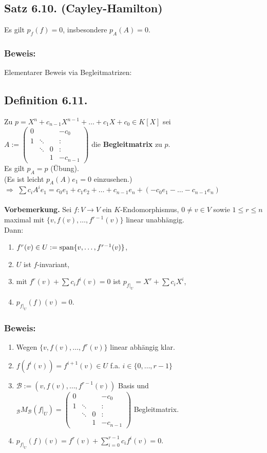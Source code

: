 \documentclass[a4paper, 12pt]{extarticle}
\newcommand{\tn}[1]{\textnormal {#1}}
\begin{document}
\subsection*{Satz 6.10. (Cayley-Hamilton)}
Es gilt $p_f(f)=0$, insbesondere $p_A(A)=0$.
\subsubsection*{Beweis:}
Elementarer Beweis via Begleitmatrizen:
\subsection*{Definition 6.11.}
Zu $p = X^n+c_{n-1}X^{n-1}+\dots+c_1X+c_0\in K[X]$ sei\\
$A :=
\left(\begin{matrix}
	0 & & & -c_0\\
	1 & \ddots & & \colon\\
	 & \ddots & 0 & \colon\\
	 & & 1 & -c_{n-1}
\end{matrix}\right)$ die \textbf{Begleitmatrix} zu $p$.\\
Es gilt $p_A = p$ (Übung).\\
(Es ist leicht $p_A(A)e_1 = 0$ einzusehen.)\\
$\Rightarrow$ $\sum c_iA^ie_1 = c_0e_1+c_1e_2+\dots+c_{n-1}e_n+(-c_0e_1-\dots-c_{n-1}e_n)$\\\\
\textbf{Vorbemerkung.} Sei $f:V\longrightarrow V$ ein $K$-Endomorphismus, $0\neq v\in V$ sowie $1 \leq r \leq n$ maximal mit $\{v, f(v), \dots, f^{r-1}(v)\}$ linear unabhängig.\\
Dann: \begin{enumerate}[label=\alph*)]
	\item $f^r(v)\in U := \tn{span}\{v, \dots, f^{r-1}(v)\}$,
	\item $U$ ist $f$-invariant,
	\item mit $f^r(v) + \sum c_if^i(v) = 0$ ist $p_{f|_U} = X^r+\sum c_iX^i$,
	\item $p_{f|_U}(f)(v) = 0$.
\end{enumerate}
\subsubsection*{Beweis:}
\begin{enumerate}[label=\alph*)]
	\item Wegen $\{v, f(v), \dots, f^r(v)\}$ linear abhängig klar.
	\item $f(f^i(v)) = f^{i+1}(v)\in U$ f.a. $i \in \{0, \dots, r-1\}$
	\item $\mathcal{B} := (v, f(v), \dots, f^{r-1}(v))$ Basis und ${_\mathcal{B}}M_{\mathcal{B}}(f|_U) = \left(\begin{matrix}
		0 & & & -c_0\\
		1 & \ddots & & \colon\\
		& \ddots & 0 & \colon\\
		& & 1 & -c_{n-1}
	\end{matrix}\right)$ Begleitmatrix.
\item $p_{f|_U}(f)(v) = f^r(v)+\sum_{i=0}^{r-1}c_if^i(v) = 0.$
\end{enumerate}
\end{document}
